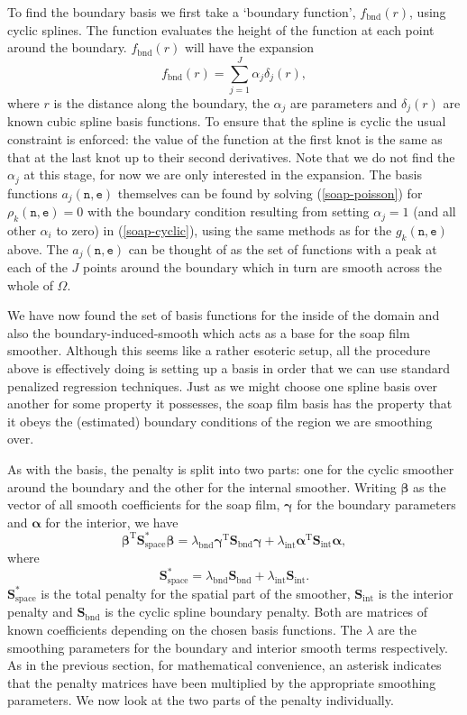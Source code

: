 \documentclass[12pt]{article}
\newcommand{\beq}{\begin{equation}}
\newcommand{\eeq}{\end{equation}}
\theoremstyle{definition}
\theoremstyle{plain}
\begin{document}
To find the boundary basis we first take a `boundary function', $f_\text{bnd}(r)$, using cyclic splines. The function evaluates the height of the function at each point around the boundary. $f_\text{bnd}(r)$ will have the expansion
\beq
f_\text{bnd}(r)=\sum_{j=1}^J \alpha_j \delta_j(r),
\label{soap-cyclic}
\eeq
where $r$ is the distance along the boundary, the $\alpha_j$ are parameters and $\delta_j(r)$ are known cubic spline basis functions. To ensure that the spline is cyclic the usual constraint is enforced: the value of the function at the first knot is the same as that at the last knot up to their second derivatives. Note that we do not find the $\alpha_j$ at this stage, for now we are only interested in the expansion. The basis functions $a_j(\texttt{n},\texttt{e})$ themselves can be found by solving (\ref{soap-poisson}) for $\rho_k(\texttt{n},\texttt{e})= 0$ with the boundary condition resulting from setting $\alpha_j=1$ (and all other $\alpha_i$ to zero) in (\ref{soap-cyclic}), using the same methods as for the $g_k(\texttt{n},\texttt{e})$ above. The $a_j(\texttt{n},\texttt{e})$ can be thought of as the set of functions with a peak at each of the $J$ points around the boundary which in turn are smooth across the whole of $\Omega$.

We have now found the set of basis functions for the inside of the domain and also the boundary-induced-smooth which acts as a base for the soap film smoother. Although this seems like a rather esoteric setup, all the procedure above is effectively doing is setting up a basis in order that we can use standard penalized regression techniques. Just as we might choose one spline basis over another for some property it possesses, the soap film basis has the property that it obeys the (estimated) boundary conditions of the region we are smoothing over.

As with the basis, the penalty is split into two parts: one for the cyclic smoother around the boundary and the other for the internal smoother. Writing $\bm\beta$ as the vector of all smooth coefficients for the soap film, $\bm\gamma$ for the boundary parameters and $\bm\alpha$ for the interior, we have
$$
\bm\beta^\text{T}\textbf{S}^*_\text{space}\bm{\beta} = \lambda_\text{bnd} \bm\gamma^\text{T}\textbf{S}_\text{bnd}\bm{\gamma} + \lambda_\text{int} \bm{\alpha}^\text{T}\textbf{S}_\text{int}\bm{\alpha},
$$
where 
$$
\textbf{S}^*_\text{space} = \lambda_\text{bnd} \textbf{S}_\text{bnd} + \lambda_\text{int} \textbf{S}_\text{int}.
$$
$\textbf{S}^*_\text{space}$ is the total penalty for the spatial part of the smoother, $\textbf{S}_\text{int}$ is the interior penalty and $\textbf{S}_\text{bnd}$ is the cyclic spline boundary penalty. Both are matrices of known coefficients depending on the chosen basis functions. The $\lambda$ are the smoothing parameters for the boundary and interior smooth terms respectively. As in the previous section, for mathematical convenience, an asterisk indicates that the penalty matrices have been multiplied by the appropriate smoothing parameters. We now look at the two parts of the penalty individually. 
\end{document}
